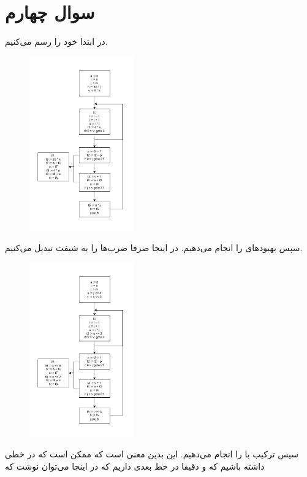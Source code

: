 \documentclass[]{article}
\begin{document}
\section*{سوال چهارم}
در ابتدا خود
را رسم می‌کنیم.
\begin{figure}[H]
    \centering
    \includegraphics[width=0.4\textwidth]{figure/Q5-01-Initial.pdf}
\end{figure}
سپس بهبود‌های
را انجام می‌دهیم. در اینجا صرفا ضرب‌ها را به شیفت تبدیل می‌کنیم.
\begin{figure}[H]
    \centering
    \includegraphics[width=0.4\textwidth]{figure/Q5-02-Arithmetic.pdf}
\end{figure}
سپس ترکیب
با
را انجام می‌دهیم. این بدین معنی است که ممکن است که در خطی داشته باشیم که
و دقیقا در خط بعدی داریم
که در اینجا می‌توان نوشت که
\end{document}
